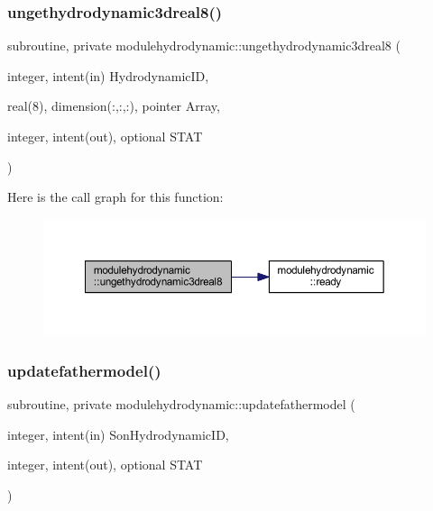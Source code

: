 \subsubsection{\texorpdfstring{ungethydrodynamic3dreal8()}{ungethydrodynamic3dreal8()}}
{\footnotesize\ttfamily subroutine, private modulehydrodynamic\+::ungethydrodynamic3dreal8 (\begin{DoxyParamCaption}\item[{integer, intent(in)}]{Hydrodynamic\+ID,  }\item[{real(8), dimension(\+:,\+:,\+:), pointer}]{Array,  }\item[{integer, intent(out), optional}]{S\+T\+AT }\end{DoxyParamCaption})\hspace{0.3cm}{\ttfamily [private]}}

Here is the call graph for this function\+:\nopagebreak
\begin{figure}[H]
\begin{center}
\leavevmode
\includegraphics[width=350pt]{namespacemodulehydrodynamic_afc2a72c29bd11cd7048168f6275a3938_cgraph}
\end{center}
\end{figure}
\mbox{\label{namespacemodulehydrodynamic_a18824f0ade9c1b8a9140a405a5a343db}} 
\subsubsection{\texorpdfstring{updatefathermodel()}{updatefathermodel()}}
{\footnotesize\ttfamily subroutine, private modulehydrodynamic\+::updatefathermodel (\begin{DoxyParamCaption}\item[{integer, intent(in)}]{Son\+Hydrodynamic\+ID,  }\item[{integer, intent(out), optional}]{S\+T\+AT }\end{DoxyParamCaption})\hspace{0.3cm}{\ttfamily [private]}}

